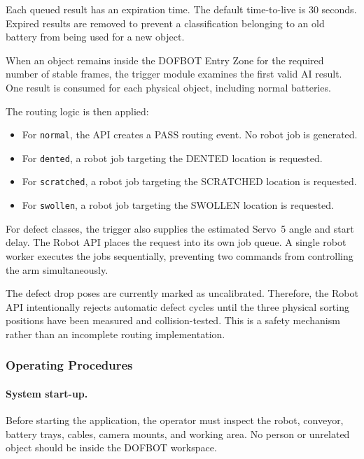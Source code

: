 Each queued result has an expiration time. The default time-to-live is 30 seconds. Expired results are removed to prevent a classification belonging to an old battery from being used for a new object.

When an object remains inside the DOFBOT Entry Zone for the required number of stable frames, the trigger module examines the first valid AI result. One result is consumed for each physical object, including normal batteries.

The routing logic is then applied:

\begin{itemize}
    \item For \texttt{normal}, the API creates a PASS routing event. No robot job is generated.
    \item For \texttt{dented}, a robot job targeting the DENTED location is requested.
    \item For \texttt{scratched}, a robot job targeting the SCRATCHED location is requested.
    \item For \texttt{swollen}, a robot job targeting the SWOLLEN location is requested.
\end{itemize}

For defect classes, the trigger also supplies the estimated Servo~5 angle and start delay. The Robot API places the request into its own job queue. A single robot worker executes the jobs sequentially, preventing two commands from controlling the arm simultaneously.

The defect drop poses are currently marked as uncalibrated. Therefore, the Robot API intentionally rejects automatic defect cycles until the three physical sorting positions have been measured and collision-tested. This is a safety mechanism rather than an incomplete routing implementation.


\subsubsection{Operating Procedures}
\label{sec:operating-procedures}

\paragraph{System start-up.}
Before starting the application, the operator must inspect the robot, conveyor, battery trays, cables, camera mounts, and working area. No person or unrelated object should be inside the DOFBOT workspace.

